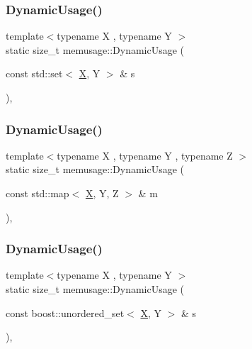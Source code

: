 \subsubsection{\texorpdfstring{Dynamic\+Usage()}{DynamicUsage()}\hspace{0.1cm}{\footnotesize\ttfamily [15/18]}}
{\footnotesize\ttfamily template$<$typename X , typename Y $>$ \\
static size\+\_\+t memusage\+::\+Dynamic\+Usage (\begin{DoxyParamCaption}\item[{const std\+::set$<$ \mbox{\hyperlink{net_8cpp_a826edd40636cbaa44266b97c8c6a4fa3}{X}}, Y $>$ \&}]{s }\end{DoxyParamCaption})\hspace{0.3cm}{\ttfamily [inline]}, {\ttfamily [static]}}

\mbox{\label{namespacememusage_a345c786f94a5f4d423ba6240273a804f}} 
\subsubsection{\texorpdfstring{Dynamic\+Usage()}{DynamicUsage()}\hspace{0.1cm}{\footnotesize\ttfamily [16/18]}}
{\footnotesize\ttfamily template$<$typename X , typename Y , typename Z $>$ \\
static size\+\_\+t memusage\+::\+Dynamic\+Usage (\begin{DoxyParamCaption}\item[{const std\+::map$<$ \mbox{\hyperlink{net_8cpp_a826edd40636cbaa44266b97c8c6a4fa3}{X}}, Y, Z $>$ \&}]{m }\end{DoxyParamCaption})\hspace{0.3cm}{\ttfamily [inline]}, {\ttfamily [static]}}

\mbox{\label{namespacememusage_a6551a2eb5c7c55534efd8715da244e83}} 
\subsubsection{\texorpdfstring{Dynamic\+Usage()}{DynamicUsage()}\hspace{0.1cm}{\footnotesize\ttfamily [17/18]}}
{\footnotesize\ttfamily template$<$typename X , typename Y $>$ \\
static size\+\_\+t memusage\+::\+Dynamic\+Usage (\begin{DoxyParamCaption}\item[{const boost\+::unordered\+\_\+set$<$ \mbox{\hyperlink{net_8cpp_a826edd40636cbaa44266b97c8c6a4fa3}{X}}, Y $>$ \&}]{s }\end{DoxyParamCaption})\hspace{0.3cm}{\ttfamily [inline]}, {\ttfamily [static]}}

